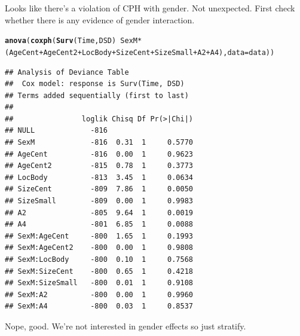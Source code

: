 \documentclass{article}\usepackage[]{graphicx}\usepackage[]{color}
\makeatletter
\newcommand{\hlopt}[1]{\textcolor[rgb]{0,0,0}{#1}}%
\newcommand{\hlstd}[1]{\textcolor[rgb]{0.345,0.345,0.345}{#1}}%
\newcommand{\hlkwc}[1]{\textcolor[rgb]{0.333,0.667,0.333}{#1}}%
\newcommand{\hlkwd}[1]{\textcolor[rgb]{0.737,0.353,0.396}{\textbf{#1}}}%
\newenvironment{kframe}{%
 \def\at@end@of@kframe{}%
 \ifinner\ifhmode%
  \def\at@end@of@kframe{\end{minipage}}%
  \begin{minipage}{\columnwidth}%
 \fi\fi%
 \def\FrameCommand##1{\hskip\@totalleftmargin \hskip-\fboxsep
 \colorbox{shadecolor}{##1}\hskip-\fboxsep
     \hskip-\linewidth \hskip-\@totalleftmargin \hskip\columnwidth}%
 \MakeFramed {\advance\hsize-\width
   \@totalleftmargin\z@ \linewidth\hsize
   \@setminipage}}%
 {\par\unskip\endMakeFramed%
 \at@end@of@kframe}
\newenvironment{knitrout}{}{} %
\makeatother
\begin{document}
Looks like there's a violation of CPH with gender.  Not unexpected.  First check whether there is any evidence of gender interaction.
\begin{knitrout}
\color{fgcolor}\begin{kframe}
\begin{alltt}
\hlkwd{anova}\hlstd{(}\hlkwd{coxph}\hlstd{(}\hlkwd{Surv}\hlstd{(Time, DSD)} \hlopt{~} \hlstd{SexM}\hlopt{*}\hlstd{(AgeCent} \hlopt{+} \hlstd{AgeCent2} \hlopt{+} \hlstd{LocBody} \hlopt{+} \hlstd{SizeCent} \hlopt{+} \hlstd{SizeSmall} \hlopt{+} \hlstd{A2} \hlopt{+} \hlstd{A4),} \hlkwc{data} \hlstd{= data))}
\end{alltt}
\begin{verbatim}
## Analysis of Deviance Table
##  Cox model: response is Surv(Time, DSD)
## Terms added sequentially (first to last)
## 
##                loglik Chisq Df Pr(>|Chi|)
## NULL             -816                    
## SexM             -816  0.31  1     0.5770
## AgeCent          -816  0.00  1     0.9623
## AgeCent2         -815  0.78  1     0.3773
## LocBody          -813  3.45  1     0.0634
## SizeCent         -809  7.86  1     0.0050
## SizeSmall        -809  0.00  1     0.9983
## A2               -805  9.64  1     0.0019
## A4               -801  6.85  1     0.0088
## SexM:AgeCent     -800  1.65  1     0.1993
## SexM:AgeCent2    -800  0.00  1     0.9808
## SexM:LocBody     -800  0.10  1     0.7568
## SexM:SizeCent    -800  0.65  1     0.4218
## SexM:SizeSmall   -800  0.01  1     0.9108
## SexM:A2          -800  0.00  1     0.9960
## SexM:A4          -800  0.03  1     0.8537
\end{verbatim}
\end{kframe}
\end{knitrout}
Nope, good.  We're not interested in gender effects so just stratify.
\end{document}
